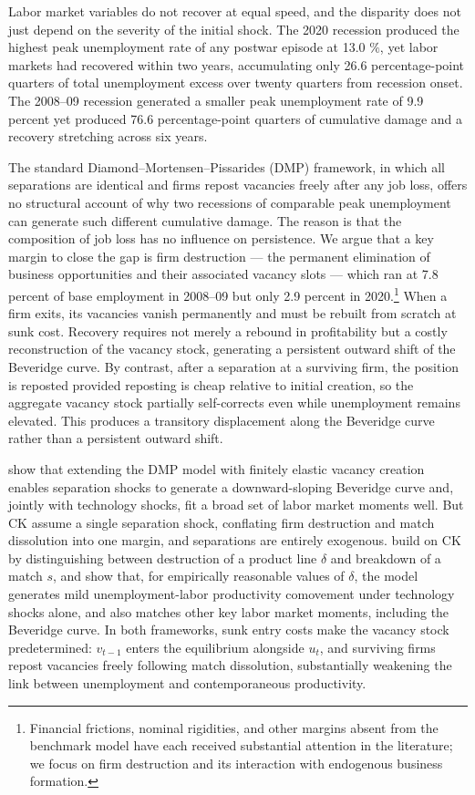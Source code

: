 \documentclass[authoryear, review, 12pt]{elsarticle}
\begin{document}
	Labor market variables do not recover at equal speed, and the 
	disparity does not just depend on the severity of the initial shock. 
	The 2020 recession produced the highest peak unemployment rate of 
	any postwar episode  at 13.0 $\%$, yet labor markets had 
	recovered within two years, accumulating only 26.6 percentage-point 
	quarters of total unemployment excess over twenty quarters from 
	recession onset. The 2008--09 recession generated a smaller peak unemployment rate of 9.9 percent yet produced 76.6 percentage-point 
	quarters of cumulative damage and a recovery stretching across six 
	years. 
	
	The standard Diamond--Mortensen--Pissarides (DMP) framework, 
	in which all separations are identical and firms repost vacancies 
	freely after any job loss, offers no structural account of why two 
	recessions of comparable peak unemployment can generate such 
	different cumulative damage. The reason is that the composition of job loss has no influence on persistence. We argue that a 
	key margin to close the gap is firm destruction --- the permanent elimination 
	of business opportunities and their associated vacancy slots --- 
	which ran at 7.8 percent of base employment in 2008--09 but only 
	2.9 percent in 2020.\footnote{Financial frictions, nominal 
		rigidities, and other margins absent from the benchmark model have 
		each received substantial attention in the literature; we focus on 
		firm destruction and its interaction with endogenous business 
		formation.} When a firm exits, its vacancies vanish permanently and 
	must be rebuilt from scratch at sunk cost.  Recovery requires not 
	merely a rebound in profitability but a costly reconstruction of the 
	vacancy stock, generating a persistent outward shift of the 
	Beveridge curve. By contrast, after a separation at a surviving firm, the position is reposted provided reposting is cheap relative to initial creation, so the aggregate vacancy stock partially self-corrects even while unemployment remains elevated. This  produces a transitory displacement along the Beveridge curve rather than a persistent  outward shift.	
	
	
	\citet{coles_2018} show that extending the DMP model with finitely 
	elastic vacancy creation enables separation shocks to generate a 
	downward-sloping Beveridge curve and, jointly with technology shocks, 
	fit a broad set of labor market moments well. But CK assume a single 
	separation shock, conflating firm destruction and match dissolution 
	into one margin, and separations are entirely exogenous. \citet{gabrovski_2025} build on CK by distinguishing 
	between destruction of a product line $\delta$ and breakdown of a 
	match $s$, and show that, for empirically reasonable values of $\delta$, the model generates mild unemployment-labor productivity comovement under technology shocks alone, and also matches other key 
	labor market moments, including the Beveridge curve. In both 
	frameworks, sunk entry costs make the vacancy stock predetermined: 
	$v_{t-1}$ enters the equilibrium alongside $u_t$, and surviving 
	firms repost vacancies freely following match dissolution, 
	substantially weakening the link between unemployment and 
	contemporaneous productivity.
	
\end{document}
